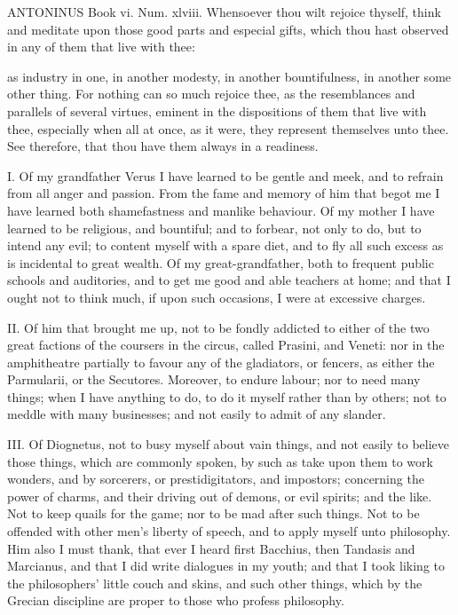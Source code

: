 ANTONINUS Book vi. Num. xlviii. Whensoever thou wilt rejoice thyself,
think and meditate upon those good parts and especial gifts, which thou
hast observed in any of them that live with thee:

as industry in one, in another modesty, in another bountifulness, in
another some other thing. For nothing can so much rejoice thee, as the
resemblances and parallels of several virtues, eminent in the dispositions
of them that live with thee, especially when all at once, as it were, they
represent themselves unto thee. See therefore, that thou have them always
in a readiness.


I. Of my grandfather Verus I have learned to be gentle and meek, and to
refrain from all anger and passion. From the fame and memory of him that
begot me I have learned both shamefastness and manlike behaviour. Of my
mother I have learned to be religious, and bountiful; and to forbear, not
only to do, but to intend any evil; to content myself with a spare diet,
and to fly all such excess as is incidental to great wealth. Of my
great-grandfather, both to frequent public schools and auditories, and to
get me good and able teachers at home; and that I ought not to think much,
if upon such occasions, I were at excessive charges.

II. Of him that brought me up, not to be fondly addicted to either of
the two great factions of the coursers in the circus, called Prasini, and
Veneti: nor in the amphitheatre partially to favour any of the gladiators,
or fencers, as either the Parmularii, or the Secutores. Moreover, to
endure labour; nor to need many things; when I have anything to do, to do
it myself rather than by others; not to meddle with many businesses; and
not easily to admit of any slander.

III. Of Diognetus, not to busy myself about vain things, and not easily
to believe those things, which are commonly spoken, by such as take upon
them to work wonders, and by sorcerers, or prestidigitators, and
impostors; concerning the power of charms, and their driving out of
demons, or evil spirits; and the like. Not to keep quails for the game;
nor to be mad after such things. Not to be offended with other men's
liberty of speech, and to apply myself unto philosophy. Him also I must
thank, that ever I heard first Bacchius, then Tandasis and Marcianus, and
that I did write dialogues in my youth; and that I took liking to the
philosophers' little couch and skins, and such other things, which by the
Grecian discipline are proper to those who profess philosophy.

